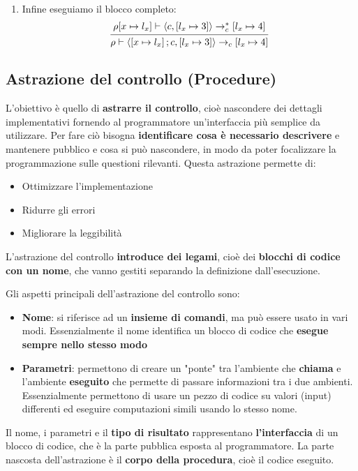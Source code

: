 \documentclass[a4paper]{article}
\begin{document}
\begin{example}
\begin{itemize}
\begin{enumerate}
        \item Infine eseguiamo il blocco completo:
          \[
            \begin{prooftree}
              \hypo{ 
                \rho[x \mapsto l_x] \vdash \left< c, \left[ l_x \mapsto 3 \right] \right>
                \to_c^*
                \left[ l_x \mapsto 4 \right]
              }
              \infer1{ 
                \rho \vdash \left< \left[ x \mapsto l_x \right]; c,
                \left[ l_x \mapsto 3 \right] \right>
                \to_c
                \left[ l_x \mapsto 4 \right]
              }
            \end{prooftree}
          \] 
      \end{enumerate}
  \end{itemize}
\end{example}

\subsection{Astrazione del controllo (Procedure)}
L'obiettivo è quello di \textbf{astrarre il controllo}, cioè nascondere dei
dettagli implementativi fornendo al programmatore un'interfaccia più semplice da
utilizzare.
Per fare ciò bisogna \textbf{identificare cosa è necessario descrivere} e mantenere
pubblico e cosa si può nascondere, in modo da poter focalizzare la programmazione
sulle questioni rilevanti. Questa astrazione permette di:
\begin{itemize}
  \item Ottimizzare l'implementazione
  \item Ridurre gli errori
  \item Migliorare la leggibilità
\end{itemize}
L'astrazione del controllo \textbf{introduce dei legami}, cioè dei \textbf{blocchi di
codice con un nome}, che vanno gestiti separando la definizione dall'esecuzione.

Gli aspetti principali dell'astrazione del controllo sono:
\begin{itemize}
  \item \textbf{Nome}: si riferisce ad un \textbf{insieme di comandi}, ma può essere
    usato in vari modi. Essenzialmente il nome identifica un blocco di codice
    che \textbf{esegue sempre nello stesso modo}

  \item \textbf{Parametri}: permettono di creare un "ponte" tra l'ambiente che
    \textbf{chiama} e l'ambiente \textbf{eseguito} che permette di passare informazioni
    tra i due ambienti. Essenzialmente permettono di usare un pezzo di codice su
    valori (input) differenti ed eseguire computazioni simili usando lo stesso nome.
\end{itemize}
Il nome, i parametri e il \textbf{tipo di risultato} rappresentano
\textbf{l'interfaccia} di un blocco di codice, che è la parte pubblica esposta al
programmatore. La parte nascosta dell'astrazione è il \textbf{corpo della procedura},
cioè il codice eseguito.
\end{document}
